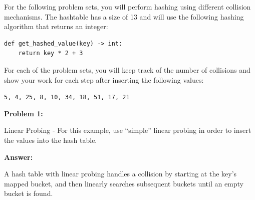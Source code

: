 \documentclass[10pt,letterpaper,final]{report}
\begin{document}
\begin{center}
  \vline
\end{center}

\medskip

For the following problem sets, you will perform hashing using different collision mechanisms.  The hashtable has a size of 13 and will use the following hashing algorithm that returns an integer:

\begin{verbatim}
def get_hashed_value(key) -> int:
    return key * 2 + 3
\end{verbatim}

For each of the problem sets, you will keep track of the number of collisions and show your work for each step after inserting the following values:

\texttt{5, 4, 25, 8, 10, 34, 18, 51, 17, 21}

\medskip
\noindent\textbf{Problem 1:}
\medskip

Linear Probing - For this example, use ``simple'' linear probing in order to insert the values into the hash table.

\medskip
\noindent\textbf{Answer:}
\medskip

A hash table with linear probing handles a collision by starting at the key's mapped bucket, and then linearly searches subsequent buckets until an empty bucket is found. \parencite{zybooks-ds2026}
\end{document}
